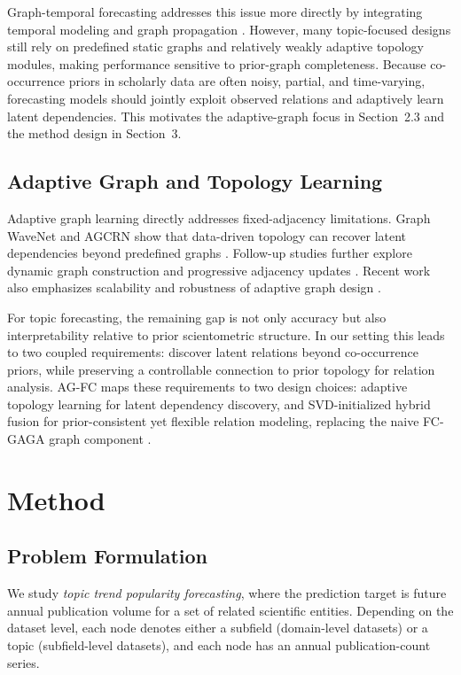 \documentclass[runningheads]{llncs}
\begin{document}
Graph-temporal forecasting addresses this issue more directly by integrating temporal modeling and graph propagation \cite{li2021spatial,shao2022decoupled}. However, many topic-focused designs still rely on predefined static graphs and relatively weakly adaptive topology modules, making performance sensitive to prior-graph completeness. Because co-occurrence priors in scholarly data are often noisy, partial, and time-varying, forecasting models should jointly exploit observed relations and adaptively learn latent dependencies. This motivates the adaptive-graph focus in Section~2.3 and the method design in Section~3.

\subsection{Adaptive Graph and Topology Learning}
Adaptive graph learning directly addresses fixed-adjacency limitations. Graph WaveNet and AGCRN show that data-driven topology can recover latent dependencies beyond predefined graphs \cite{wu2019graph,bai2020adaptive}. Follow-up studies further explore dynamic graph construction and progressive adjacency updates \cite{li2023dynamic,duan2025dynamic}. Recent work also emphasizes scalability and robustness of adaptive graph design \cite{shin2024pgcn,ma2025less}.

For topic forecasting, the remaining gap is not only accuracy but also interpretability relative to prior scientometric structure. In our setting this leads to two coupled requirements: discover latent relations beyond co-occurrence priors, while preserving a controllable connection to prior topology for relation analysis. AG-FC maps these requirements to two design choices: adaptive topology learning for latent dependency discovery, and SVD-initialized hybrid fusion for prior-consistent yet flexible relation modeling, replacing the naive FC-GAGA graph component \cite{oreshkin2021fc}.

\section{Method}
\subsection{Problem Formulation}
We study \emph{topic trend popularity forecasting}, where the prediction target is future annual publication volume for a set of related scientific entities. Depending on the dataset level, each node denotes either a subfield (domain-level datasets) or a topic (subfield-level datasets), and each node has an annual publication-count series.
\end{document}
